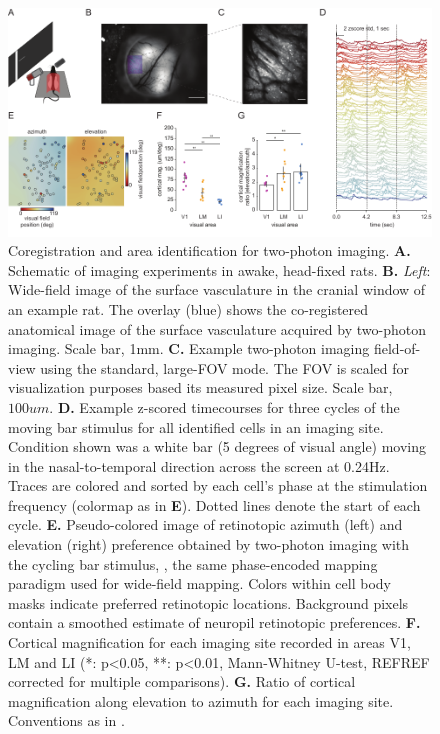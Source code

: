 \begin{figure}
    \includegraphics[width=\textwidth]{figures/chapter_3/fig_3-1_2p_retino/fig_3-1_2p_retino.pdf}
    \vspace{.1in}
    \caption[Identification of areas with two-photon imaging]{Coregistration and area identification for two-photon imaging. \textbf{A.} Schematic of imaging experiments in awake, head-fixed rats. 
    \textbf{B.} \textit{Left}: Wide-field image of the surface vasculature in the cranial window of an example rat. The overlay (blue) shows the co-registered anatomical image of the surface vasculature acquired by two-photon imaging. Scale bar, 1mm. 
    \textbf{C.} Example two-photon imaging field-of-view using the standard, large-FOV mode. The FOV is scaled for visualization purposes based its measured pixel size. Scale bar, $100um$. 
    \textbf{D.} Example z-scored timecourses for three cycles of the moving bar stimulus for all identified cells in an imaging site. Condition shown was a white bar (5 degrees of visual angle) moving in the nasal-to-temporal direction across the screen at 0.24Hz. Traces are colored and sorted by each cell's phase at the stimulation frequency (colormap as in \textbf{E}). Dotted lines denote the start of each cycle. 
    \textbf{E.} Pseudo-colored image of retinotopic azimuth (left) and elevation (right) preference obtained by two-photon imaging with the cycling bar stimulus, , the same phase-encoded mapping paradigm used for wide-field mapping. Colors within cell body masks indicate preferred retinotopic locations. Background pixels contain a smoothed estimate of neuropil retinotopic preferences. 
    \textbf{F.} Cortical magnification for each imaging site recorded in areas V1, LM and LI (*: p<0.05, **: p<0.01, Mann-Whitney U-test, REFREF corrected for multiple comparisons). 
    \textbf{G.} Ratio of cortical magnification along elevation to azimuth for each imaging site. Conventions as in .   
    \label{fig:2p_retino}}
\end{figure}

